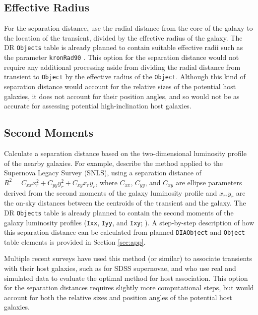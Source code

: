 \documentclass[DM,lsstdraft,authoryear,toc]{lsstdoc}
\begin{document}
\subsection{Effective Radius}

For the separation distance, use the radial distance from the core of the galaxy to the location of the transient, divided by the effective radius of the galaxy.
The DR {\tt Objects} table is already planned to contain suitable effective radii such as the parameter {\tt kronRad90} .
This option for the separation distance would not require any additional processing aside from dividing the radial distance from transient to {\tt Object} by the effective radius of the {\tt Object}.
Although this kind of separation distance would account for the relative sizes of the potential host galaxies, it does not account for their position angles, and so would not be as accurate for assessing potential high-inclination host galaxies.

\subsection{Second Moments}

Calculate a separation distance based on the two-dimensional luminosity profile of the nearby galaxies.
For example, \citet{2006ApJ...648..868S} describe the method applied to the Supernova Legacy Survey (SNLS), using a separation distance of $R^2 = C_{xx} x_r^2 + C_{yy} y_r^2 + C_{xy} x_r y_r$, where $C_{xx}$, $C_{yy}$, and $C_{xy}$ are ellipse parameters derived from the second moments of the galaxy luminosity profile and $x_r$,$y_r$ are the on-sky distances between the centroids of the transient and the galaxy.
The DR {\tt Objects} table is already planned to contain the second moments of the galaxy luminosity profiles ({\tt Ixx}, {\tt Iyy}, and {\tt Ixy}; ).
A step-by-step description of how this separation distance can be calculated from planned {\tt DIAObject} and {\tt Object} table elements is provided in Section \ref{sec:app}.

Multiple recent surveys have used this method (or similar) to associate transients with their host galaxies, such as \citet{2018PASP..130f4002S} for SDSS supernovae, and \citet{2016AJ....152..154G} who use real and simulated data to evaluate the optimal method for host association.
This option for the separation distances requires slightly more computational steps, but would account for both the relative sizes and position angles of the potential host galaxies. 
\end{document}
